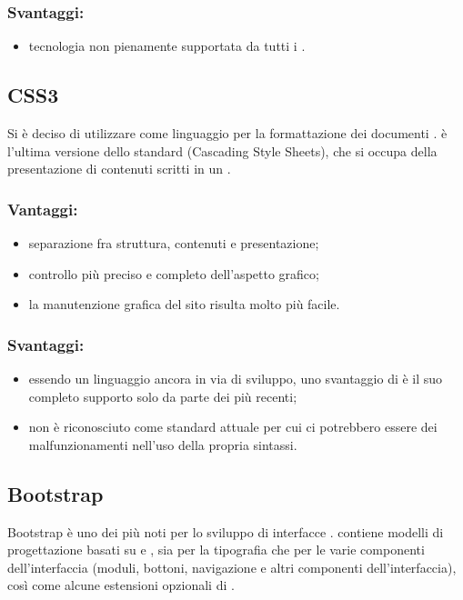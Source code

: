 \documentclass[a4paper, titlepage]{article}
\begin{document}
\subsubsection{Svantaggi:}

\begin{itemize}
	\item tecnologia non pienamente supportata da tutti i .
\end{itemize}

\subsection{CSS3}
Si è deciso di utilizzare  come linguaggio per la formattazione dei documenti .  è l'ultima versione dello standard  (Cascading Style Sheets), che si occupa della presentazione di contenuti scritti in un .

\subsubsection{Vantaggi:}

\begin{itemize}
	\item separazione fra struttura, contenuti e presentazione;
	\item controllo più preciso e completo dell'aspetto grafico;
	\item la manutenzione grafica del sito risulta molto più facile.
\end{itemize}

\subsubsection{Svantaggi:}

\begin{itemize}
	\item essendo un linguaggio ancora in via di sviluppo, uno svantaggio di  è il suo completo supporto solo da parte dei   più recenti;
	\item non è riconosciuto come standard attuale per cui ci potrebbero essere dei malfunzionamenti nell'uso della propria sintassi. 
\end{itemize}

\subsection{Bootstrap}
Bootstrap è uno dei più noti  per lo sviluppo di interfacce .  contiene modelli di progettazione basati su  e , sia per la tipografia che per le varie componenti dell'interfaccia (moduli, bottoni, navigazione e altri componenti dell'interfaccia), così come alcune estensioni opzionali di .
\end{document}
